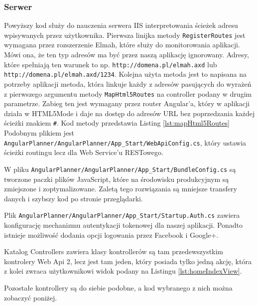 \documentclass[10pt,titlepage]{article}
\begin{document}
\subsubsection{Serwer}
\lstset{style=sharpc}

\par Powyższy kod służy do nauczenia serwera IIS interpretowania ścieżek adresu wpisywanych przez użytkownika. Pierwsza linijka metody \verb|RegisterRoutes| jest wymagana przez rozszerzenie Elmah, które służy do monitorowania aplikacji. Mówi ona, że ten typ adresów ma być przez naszą aplikację ignorowany. Adresy, które spełniają ten warunek to np. \verb|http://domena.pl/elmah.axd| lub \verb|http://domena.pl/elmah.axd/1234|. Kolejna użyta metoda jest to napisana na potrzeby aplikacji metoda, która linkuje każdy z adresów pasujących do wyrażeń z pierwszego argumentu metody \verb|MapHtml5Routes| na controller podany w drugim parametrze. Zabieg ten jest wymagany przez router Angular'a, który w aplikacji działa w HTML5Mode i daje na dostęp do adresów URL bez poprzedzania każdej ścieżki znakiem \verb|#|. Kod metody przedstawia Listing \ref{lst:mapHtml5Routes} Podobnym plikiem jest \verb|AngularPlanner/AngularPlanner/App_Start/WebApiConfig.cs|, który ustawia ścieżki routingu lecz dla Web Service'u RESTowego.

\par W pliku \verb|AngularPlanner/AngularPlanner/App_Start/BundleConfig.cs| są tworzone paczki plików JavaScript, które na środowisku produkcyjnym są zmiejszone i zoptymalizowane. Zaletą tego rozwiązania są mniejsze transfery danych i szybszy kod po stronie przeglądarki.\par Plik \verb|AngularPlanner/AngularPlanner/App_Start/Startup.Auth.cs| zawiera konfigurację mechanizmu autentykacji tokenowej dla naszej aplikacji. Ponadto istnieje możliwość dodania opcji logowania przez Facebook i Google+.\par Katalog Controllers zawiera klasy kontrollerów są tam przedewszystkim kontrolery Web Api 2, lecz jest tam jeden, który posiada tylko jedną akcję, która z kolei zwraca użytkownikowi widok podany na Listingu \ref{lst:homeIndexView}.

\par Pozostałe kontrollery są do siebie podobne, a kod wybranego z nich można zobaczyć poniżej.
\end{document}
